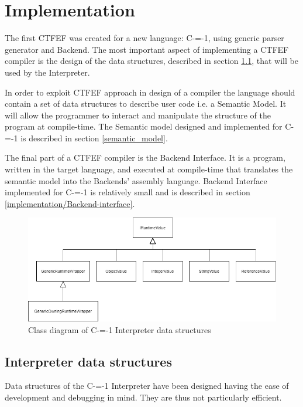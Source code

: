 \section{Implementation}
\label{implementation}

The first CTFEF was created for a new language: C-=-1, using generic parser generator and Backend.
The most important aspect of implementing a CTFEF compiler is the design of the data structures, described in section \ref{data_structures}, that will be used by the Interpreter.

In order to exploit CTFEF approach in design of a compiler the language should contain a set of data structures to describe user code i.e. a Semantic Model.
It will allow the programmer to interact and manipulate the structure of the program at compile-time.
The Semantic model designed and implemented for C-=-1 is described in section \ref{semantic_model}.

The final part of a CTFEF compiler is the Backend Interface.
It is a program, written in the target language, and executed at compile-time that translates the semantic model into the Backends' assembly language.
Backend Interface implemented for C-=-1 is relatively small and is described in section \ref{implementation/Backend-interface}.

\begin{figure}
	\centering
	\includegraphics[width=13cm]{pictures/Interpreter_data_structures_uml.png}
	\caption{Class diagram of C-=-1 Interpreter data structures}
	\label{fig:Interpreter_data_structures}
\end{figure}

\subsection{Interpreter data structures}
\label{data_structures}
Data structures of the C-=-1 Interpreter have been designed having the ease of development and debugging in mind.
They are thus not particularly efficient.


